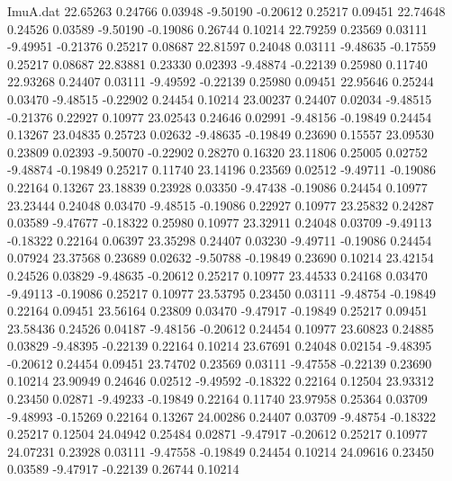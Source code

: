 \begin{filecontents}{ImuA.dat}
  22.65263    0.24766    0.03948   -9.50190   -0.20612    0.25217    0.09451
  22.74648    0.24526    0.03589   -9.50190   -0.19086    0.26744    0.10214
  22.79259    0.23569    0.03111   -9.49951   -0.21376    0.25217    0.08687
  22.81597    0.24048    0.03111   -9.48635   -0.17559    0.25217    0.08687
  22.83881    0.23330    0.02393   -9.48874   -0.22139    0.25980    0.11740
  22.93268    0.24407    0.03111   -9.49592   -0.22139    0.25980    0.09451
  22.95646    0.25244    0.03470   -9.48515   -0.22902    0.24454    0.10214
  23.00237    0.24407    0.02034   -9.48515   -0.21376    0.22927    0.10977
  23.02543    0.24646    0.02991   -9.48156   -0.19849    0.24454    0.13267
  23.04835    0.25723    0.02632   -9.48635   -0.19849    0.23690    0.15557
  23.09530    0.23809    0.02393   -9.50070   -0.22902    0.28270    0.16320
  23.11806    0.25005    0.02752   -9.48874   -0.19849    0.25217    0.11740
  23.14196    0.23569    0.02512   -9.49711   -0.19086    0.22164    0.13267
  23.18839    0.23928    0.03350   -9.47438   -0.19086    0.24454    0.10977
  23.23444    0.24048    0.03470   -9.48515   -0.19086    0.22927    0.10977
  23.25832    0.24287    0.03589   -9.47677   -0.18322    0.25980    0.10977
  23.32911    0.24048    0.03709   -9.49113   -0.18322    0.22164    0.06397
  23.35298    0.24407    0.03230   -9.49711   -0.19086    0.24454    0.07924
  23.37568    0.23689    0.02632   -9.50788   -0.19849    0.23690    0.10214
  23.42154    0.24526    0.03829   -9.48635   -0.20612    0.25217    0.10977
  23.44533    0.24168    0.03470   -9.49113   -0.19086    0.25217    0.10977
  23.53795    0.23450    0.03111   -9.48754   -0.19849    0.22164    0.09451
  23.56164    0.23809    0.03470   -9.47917   -0.19849    0.25217    0.09451
  23.58436    0.24526    0.04187   -9.48156   -0.20612    0.24454    0.10977
  23.60823    0.24885    0.03829   -9.48395   -0.22139    0.22164    0.10214
  23.67691    0.24048    0.02154   -9.48395   -0.20612    0.24454    0.09451
  23.74702    0.23569    0.03111   -9.47558   -0.22139    0.23690    0.10214
  23.90949    0.24646    0.02512   -9.49592   -0.18322    0.22164    0.12504
  23.93312    0.23450    0.02871   -9.49233   -0.19849    0.22164    0.11740
  23.97958    0.25364    0.03709   -9.48993   -0.15269    0.22164    0.13267
  24.00286    0.24407    0.03709   -9.48754   -0.18322    0.25217    0.12504
  24.04942    0.25484    0.02871   -9.47917   -0.20612    0.25217    0.10977
  24.07231    0.23928    0.03111   -9.47558   -0.19849    0.24454    0.10214
  24.09616    0.23450    0.03589   -9.47917   -0.22139    0.26744    0.10214

\end{filecontents}
